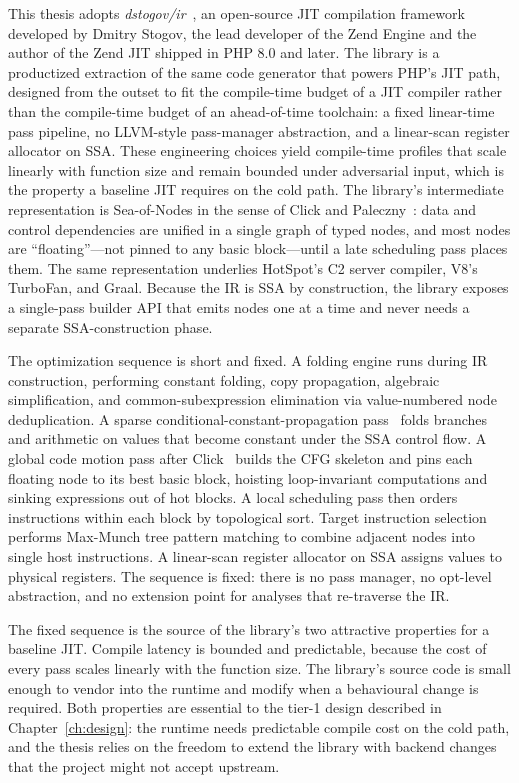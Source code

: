This thesis adopts \emph{dstogov/ir}~\cite{dstogov-ir}, an open-source JIT compilation framework developed by Dmitry Stogov, the lead developer of the Zend Engine and the author of the Zend JIT shipped in PHP 8.0 and later. The library is a productized extraction of the same code generator that powers PHP's JIT path, designed from the outset to fit the compile-time budget of a JIT compiler rather than the compile-time budget of an ahead-of-time toolchain: a fixed linear-time pass pipeline, no LLVM-style pass-manager abstraction, and a linear-scan register allocator on SSA. These engineering choices yield compile-time profiles that scale linearly with function size and remain bounded under adversarial input, which is the property a baseline JIT requires on the cold path. The library's intermediate representation is Sea-of-Nodes in the sense of Click and Paleczny~\cite{click1995sea}: data and control dependencies are unified in a single graph of typed nodes, and most nodes are ``floating''---not pinned to any basic block---until a late scheduling pass places them. The same representation underlies HotSpot's C2 server compiler, V8's TurboFan, and Graal. Because the IR is SSA by construction, the library exposes a single-pass builder API that emits nodes one at a time and never needs a separate SSA-construction phase.

The optimization sequence is short and fixed. A folding engine runs during IR construction, performing constant folding, copy propagation, algebraic simplification, and common-subexpression elimination via value-numbered node deduplication. A sparse conditional-constant-propagation pass~\cite{dstogov-ir} folds branches and arithmetic on values that become constant under the SSA control flow. A global code motion pass after Click~\cite{click1995gcm} builds the CFG skeleton and pins each floating node to its best basic block, hoisting loop-invariant computations and sinking expressions out of hot blocks. A local scheduling pass then orders instructions within each block by topological sort. Target instruction selection performs Max-Munch tree pattern matching to combine adjacent nodes into single host instructions. A linear-scan register allocator on SSA assigns values to physical registers. The sequence is fixed: there is no pass manager, no opt-level abstraction, and no extension point for analyses that re-traverse the IR.

The fixed sequence is the source of the library's two attractive properties for a baseline JIT. Compile latency is bounded and predictable, because the cost of every pass scales linearly with the function size. The library's source code is small enough to vendor into the runtime and modify when a behavioural change is required. Both properties are essential to the tier-1 design described in Chapter~\ref{ch:design}: the runtime needs predictable compile cost on the cold path, and the thesis relies on the freedom to extend the library with backend changes that the project might not accept upstream.


